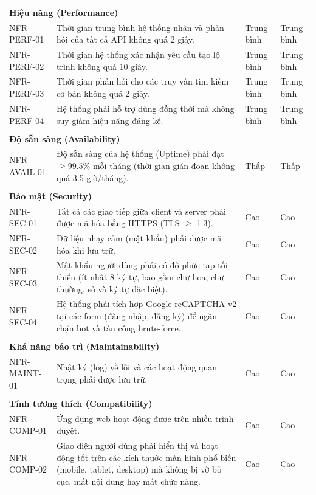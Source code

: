 \begin{longtable}{p{2.4cm} p{7.0cm} p{2.0cm} p{2.0cm}}
\multicolumn{4}{l}{\textbf{Hiệu năng (Performance)}}\\[2pt]
NFR-PERF-01  & Thời gian trung bình hệ thống nhận và phản hồi của tất cả API không quá 2 giây. & Trung bình & Trung bình \\
NFR-PERF-02  & Thời gian hệ thống xác nhận yêu cầu tạo lộ trình không quá 10 giây. & Trung bình & Trung bình  \\
NFR-PERF-03  & Thời gian phản hồi cho các truy vấn tìm kiếm cơ bản không quá 2 giây.  & Trung bình & Trung bình \\
NFR-PERF-04  & Hệ thống phải hỗ trợ dùng đồng thời mà không suy giảm hiệu năng đáng kể. & Trung bình & Trung bình \\
\\[6pt]
\multicolumn{4}{l}{\textbf{Độ sẵn sàng (Availability)}}\\[2pt]
NFR-AVAIL-01 & Độ sẵn sàng của hệ thống (Uptime) phải đạt $\geq 99.5\%$ mỗi tháng (thời gian gián đoạn không quá 3.5 giờ/tháng).  & Thấp       & Thấp      \\
\\[6pt]
\multicolumn{4}{l}{\textbf{Bảo mật (Security)}}\\[2pt]
NFR-SEC-01   & Tất cả các giao tiếp giữa client và server phải được mã hóa bằng HTTPS (TLS $\geq$ 1.3).  & Cao        & Cao   \\
NFR-SEC-02   & Dữ liệu nhạy cảm (mật khẩu) phải được mã hóa khi lưu trữ. & Cao        & Cao      \\
NFR-SEC-03   & Mật khẩu người dùng phải có độ phức tạp tối thiểu (ít nhất 8 ký tự, bao gồm chữ hoa, chữ thường, số và ký tự đặc biệt).   & Cao        & Cao      \\
NFR-SEC-04   & Hệ thống phải tích hợp Google reCAPTCHA v2 tại các form (đăng nhập, đăng ký) để ngăn chặn bot và tấn công brute-force.   & Cao        & Cao      \\
\\[6pt]
\multicolumn{4}{l}{\textbf{Khả năng bảo trì (Maintainability)}}\\[2pt]
NFR-MAINT-01 & Nhật ký (log) về lỗi và các hoạt động quan trọng phải được lưu trữ.   & Cao        & Cao   \\
\\[6pt]
\multicolumn{4}{l}{\textbf{Tính tương thích (Compatibility)}}\\[2pt]
NFR-COMP-01  & Ứng dụng web hoạt động được trên nhiều trình duyệt.   & Cao        & Cao  \\
NFR-COMP-02  & Giao diện người dùng phải hiển thị và hoạt động tốt trên các kích thước màn hình phổ biến (mobile, tablet, desktop) mà không bị vỡ bố cục, mất nội dung hay mất chức năng. & Cao & Cao \\

\end{longtable}
